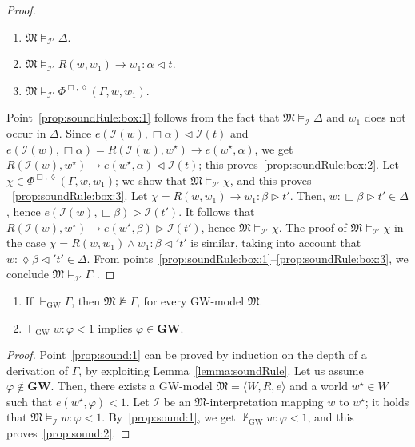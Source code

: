 \documentclass[copyright,creativecommons]{eptcs}
\newcommand{\GWL}{\mathbf{GW}}
\newcommand{\GWM}{\mbox{$\mathrm{GW}$}}
\newcommand{\Diam}{\lozenge}
\newcommand{\Phibd}[1]{\Phi^{\Box,\Diam}(#1)}
\newcommand{\gt}{\rhd}
\newcommand{\lt}{\lhd}
\newcommand{\stru}[1]{\langle #1 \rangle} %
\newcommand{\provesw}[1]{\vdash_{\mathrm{GW}} #1}
\newcommand{\nprovesw}[1]{\nvdash_{\mathrm{GW}} #1}
\newcommand{\M}{\mathfrak{M}}
\renewcommand{\a}{\alpha}
\renewcommand{\b}{\beta}
\newcommand{\D}{\Delta}
\newcommand{\G}{\Gamma}
\newcommand{\Ical}{\mathcal{I}}
\begin{document}
\begin{proof}
  \begin{enumerate}[label=(\roman*), ref=(\roman*),leftmargin=*]    
  \item\label{prop:soundRule:box:1}     
 $\M\models_{\Ical'}\Delta$.

\item\label{prop:soundRule:box:2}     
$\M\models_{\Ical'} R(w,w_1)\to w_1:\a\lt t$.

\item\label{prop:soundRule:box:3}     
  $\M\models_{\Ical'} \Phibd{\G,w,w_1}$.
  \end{enumerate}
  Point~\ref{prop:soundRule:box:1} follows from the fact that $\M\models_{\Ical}\Delta$ and $w_1$ does not occur in $\D$.
  Since $e(\Ical(w),\Box \a)\lt \Ical(t)$ and $e(\Ical(w),\Box
    \a) = R(\Ical(w),w^\star)\to e(w^\star,\a)$, we get
    $R(\Ical(w),w^\star)\to e(w^\star,\a)\lt \Ical(t)$; this proves~\ref{prop:soundRule:box:2}.
    Let $\chi\in\Phibd{\G,w,w_1}$;  we show that  $\M\models_{\Ical'}\chi$,
    and this proves ~\ref{prop:soundRule:box:3}.
    Let  $\chi=R(w,w_1)\to w_1:\b\gt t'$. Then,  $w : \Box \b \gt t'\in \Delta$,
hence $e(\Ical(w),\Box \b) \gt \Ical(t')$. It follows that
 $R(\Ical(w),w^\star)\to e(w^\star,\b)\gt
 \Ical(t')$,  hence $\M\models_{\Ical'} \chi$.
 The  proof of   $\M\models_{\Ical'} \chi$ in the  case $\chi= R(w,w_1)\wedge w_1 : \b  \lt' t'$ is similar,
 taking into account that  $w : \Diam \b \lt' t'\in \Delta$.
From points~\ref{prop:soundRule:box:1}--\ref{prop:soundRule:box:3}, we conclude  $\M\models_{\Ical'} \G_1$.  
\end{proof}




\begin{proposition}[Soundness]\label{prop:sound}
  \begin{enumerate}[label=(\roman*), ref=(\roman*),leftmargin=*]    
  \item\label{prop:sound:1} If $\provesw{\G}$, then $\M\not\models
    \G$, for every \GWM-model $\M$.
    
  \item\label{prop:sound:2} $\provesw w:\varphi < 1$ implies
    $\varphi\in\GWL$.
  \end{enumerate}
\end{proposition}

\begin{proof} 
  Point~\ref{prop:sound:1} can be  proved by induction on the
  depth of a derivation of $\G$, by exploiting
  Lemma~\ref{lemma:soundRule}.  Let
  us  assume  $\varphi\not\in\GWL$.  Then, there exists a \GWM-model
  $\M=\stru{W,R,e}$ and a world $ w^\star\in W$ such that
  $e(w^\star,\varphi) < 1$.  Let $\Ical$ be an $\M$-interpretation
  mapping $w$ to $w^\star$; it holds that $\M\models_\Ical w:\varphi < 1$. 
  By~\ref{prop:sound:1},
we get $\nprovesw w:\varphi < 1$, and this
proves~\ref{prop:sound:2}. 
\end{proof}
\end{document}

